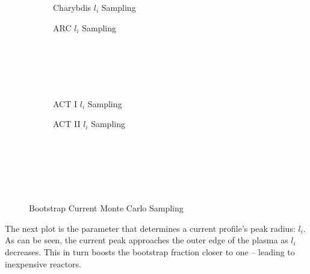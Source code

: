 \begin{figure*}
    \centering
    \hfill
    \begin{subfigure}[t]{0.45\textwidth}
        \centering
		\begin{adjustbox}{width=\textwidth}
			\Large
			
		\end{adjustbox}
        \caption{Charybdis $l_i$ Sampling}
    \end{subfigure}
    \hfill
    \begin{subfigure}[t]{0.45\textwidth}
        \centering
		\begin{adjustbox}{width=\textwidth}
			\Large
			
		\end{adjustbox}
        \caption{ARC $l_i$ Sampling}
    \end{subfigure}
    \hfill \hfill ~\\ ~\\ ~\\ ~\\
    \hfill
    \begin{subfigure}[t]{0.45\textwidth}
        \centering
		\begin{adjustbox}{width=\textwidth}
			\Large
			
		\end{adjustbox}
        \caption{ACT I $l_i$ Sampling}
    \end{subfigure}
    \hfill
    \begin{subfigure}[t]{0.45\textwidth}
        \centering
		\begin{adjustbox}{width=\textwidth}
			\Large
			
		\end{adjustbox}
        \caption{ACT II $l_i$ Sampling}
    \end{subfigure}
    \hfill \hfill ~\\ ~\\ ~\\
    \caption{Bootstrap Current Monte Carlo Sampling}
    \label{fig:bootstrap_samplings} ~ \\
\end{figure*}

The next plot  is the parameter that determines a current profile's peak radius: $l_i$. As can be seen, the current peak approaches the outer edge of the plasma as $l_i$ decreases. This in turn boosts the bootstrap fraction closer to one -- leading to inexpensive reactors.

